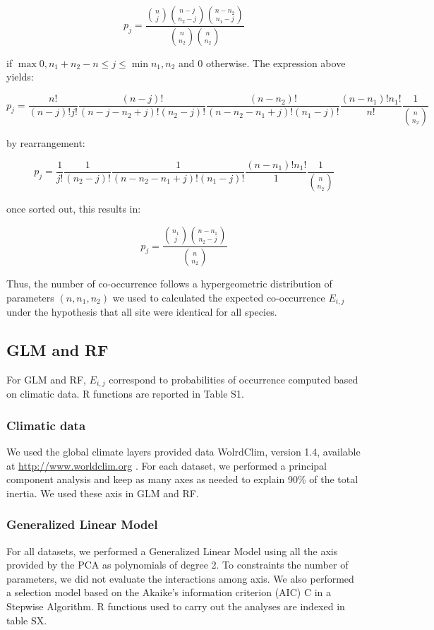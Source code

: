 \[ p_j= \frac{\binom{n}{j} \binom{n-j}{n_2-j} \binom{n-n_2}{n_1-j}}{\binom{n}{n_2} \binom{n}{n_2}} \]

if \(\max{0, n_1+n_2-n} \leq j \leq \min{n_1, n_2}\) and 0 otherwise.
The expression above yields:

\[ p_j= \frac{n!}{(n-j)!j!} \frac{(n-j)!}{(n-j-n_2+j)!(n_2-j)!} \frac{(n-n_2)!}{(n-n_2-n_1+j)!(n_1-j)!} \frac{(n-n_1)!n_1!}{n!} \frac{1}{\binom{n}{n_2}} \]

by rearrangement:

\[ p_j= \frac{1}{j!} \frac{1}{(n_2-j)!} \frac{1}{(n-n_2-n_1+j)!(n_1-j)!} \frac{(n-n_1)!n_1!}{1} \frac{1}{\binom{n}{n_2}} \]

once sorted out, this results in:

\[ p_j= \frac{\binom{n_1}{j} \binom{n-n_1}{n_2-j}}{\binom{n}{n_2}} \]

Thus, the number of co-occurrence follows a hypergeometric distribution
of parameters \((n,n_1,n_2)\) we used to calculated the expected
co-occurrence \(E_{i,j}\) under the hypothesis that all site were
identical for all species.

\subsection{GLM and RF}\label{glm-and-rf}

For GLM and RF, \(E_{i,j}\) correspond to probabilities of occurrence
computed based on climatic data. R functions are reported in Table S1.

\subsubsection{Climatic data}\label{climatic-data}

We used the global climate layers provided data WolrdClim, version 1.4,
available at \url{http://www.worldclim.org} \citep{Hijmans_2005}. For
each dataset, we performed a principal component analysis and keep as
many axes as needed to explain 90\% of the total inertia. We used these
axis in GLM and RF.

\subsubsection{Generalized Linear Model}\label{generalized-linear-model}

For all datasets, we performed a Generalized Linear Model
\citep{Elith_2006} using all the axis provided by the PCA as polynomials
of degree 2. To constraints the number of parameters, we did not
evaluate the interactions among axis. We also performed a selection
model based on the Akaike's information criterion (AIC) C in a Stepwise
Algorithm. R functions used to carry out the analyses are indexed in
table SX.

